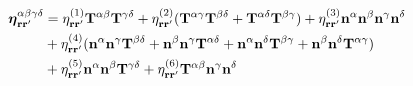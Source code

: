 \documentclass[b5paper,openright,11pt]{book}
\begin{document}
\begin{appendices}
\begin{align}
\boldsymbol{\eta}_{{\bf r}{\bf r}'}^{\alpha\beta\gamma\delta}  
&=
\eta^{(1)}_{{\bf r}{\bf r}'}{\bf T}^{\alpha\beta}{\bf T}^{\gamma\delta}
+\eta^{(2)}_{{\bf r}{\bf r}'}({\bf T}^{\alpha\gamma}{\bf T}^{\beta\delta}
+{\bf T}^{\alpha\delta}{\bf T}^{\beta\gamma}) +
\eta^{(3)}_{{\bf r}{\bf r}'} {\bf n}^\alpha  {\bf n}^\beta   {\bf n}^\gamma   {\bf n}^\delta 
\nonumber\\
&+\eta^{(4)}_{{\bf r}{\bf r}'}(
{\bf n}^\alpha  {\bf n}^\gamma {\bf T}^{\beta\delta}+ 
{\bf n}^\beta  {\bf n}^\gamma {\bf T}^{\alpha\delta}+ 
{\bf n}^\alpha  {\bf n}^\delta {\bf T}^{\beta\gamma}+ 
{\bf n}^\beta  {\bf n}^\delta {\bf T}^{\alpha\gamma}) 
\nonumber \\
&+\eta^{(5)}_{{\bf r}{\bf r}'}{\bf n}^\alpha  {\bf n}^\beta {\bf T}^{\gamma\delta} 
+\eta^{(6)}_{{\bf r}{\bf r}'}{\bf T}^{\alpha\beta} {\bf n}^\gamma  {\bf n}^\delta 
\label{viscosityTangential}
\end{align}
%
%

\end{appendices}
\end{document}
